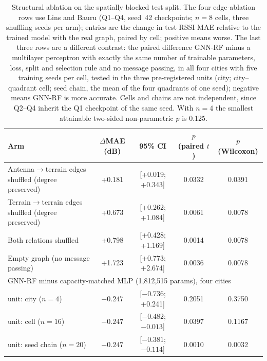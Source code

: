 \begin{table}[t]
\caption{Structural ablation on the spatially blocked test split. The four edge-ablation rows use Lins and Bauru (Q1--Q4, seed~42 checkpoints; $n=8$ cells, three shuffling seeds per arm); entries are the change in test RSSI MAE relative to the trained model with the real graph, paired by cell; positive means worse. The last three rows are a different contrast: the paired difference GNN-RF minus a multilayer perceptron with exactly the same number of trainable parameters, loss, split and selection rule and no message passing, in all four cities with five training seeds per cell, tested in the three pre-registered units (city; city--quadrant cell; seed chain, the mean of the four quadrants of one seed); negative means GNN-RF is more accurate. Cells and chains are not independent, since Q2--Q4 inherit the Q1 checkpoint of the same seed. With $n=4$ the smallest attainable two-sided non-parametric $p$ is 0.125.}
\label{tab:structural_ablation}
\centering
\begin{tabular}{lccc c}
\toprule
Arm & $\Delta$MAE (dB) & 95\% CI & $p$ (paired $t$) & $p$ (Wilcoxon) \\
\midrule
Antenna$\to$terrain edges shuffled (degree preserved) & +0.181 & [+0.019; +0.343] & 0.0332 & 0.0391 \\
Terrain$\to$terrain edges shuffled (degree preserved) & +0.673 & [+0.262; +1.084] & 0.0061 & 0.0078 \\
Both relations shuffled & +0.798 & [+0.428; +1.169] & 0.0014 & 0.0078 \\
Empty graph (no message passing) & +1.723 & [+0.773; +2.674] & 0.0036 & 0.0078 \\
\midrule
\multicolumn{5}{l}{GNN-RF minus capacity-matched MLP (1{,}812{,}515 params), four cities} \\
\quad unit: city ($n=4$) & $-0.247$ & [$-0.736$; +0.241] & 0.2051 & 0.3750 \\
\quad unit: cell ($n=16$) & $-0.247$ & [$-0.482$; $-0.013$] & 0.0397 & 0.1167 \\
\quad unit: seed chain ($n=20$) & $-0.247$ & [$-0.381$; $-0.114$] & 0.0010 & 0.0032 \\
\bottomrule
\end{tabular}
\end{table}
